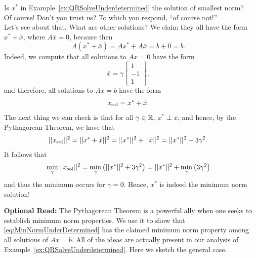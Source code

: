 \vspace*{.2cm}

\begin{tcolorbox}[title = \textbf{A Quick Check}]
Is $x^\ast$ in Example~\ref{ex:QRSolveUnderdetermined} the solution of smallest norm? Of course! Don't you trust us? To which you respond, ``of course not!'' \\

Let's see about that. What are other solutions? We claim they all have the form
$x^\ast + \bar{x}$, where $A \bar{x} = 0$, because then 
$$A(x^\ast + \bar{x}) = A x^\ast + A \bar{x} = b + 0 = b.$$
Indeed, we compute that all solutions to $Ax = 0$ have the form
$$ \bar{x} = \gamma \left[ \begin{array}{r}
1 \\
-1 \\ 
 1  \end{array} \right],$$
 and therefore, all solutions to $Ax=b$ have the form
 $$x_{\rm sol} = x^\ast + \bar{x}. $$
 The next thing we can check is that for all $\gamma \in \mathbb R,$ $x^\ast \perp \bar{x}$, and hence, by the Pythagorean Theorem, we have that
 $$||x_{\rm sol}||^2 = ||x^\ast + \bar{x}||^2 =  ||x^\ast||^2 + ||\bar{x}||^2 = ||x^\ast||^2 + {3} \gamma^2.$$
 It follows that $$\min_{\gamma} || x_{\rm sol}||^2 = \min_{\gamma} \left( ||x^\ast||^2 + {3} \gamma^2  \right) =  ||x^\ast||^2 + \min_{\gamma} \left({3} \gamma^2\right)$$
and thus the minimum occurs for $\gamma = 0$. Hence, $x^\ast$ is indeed the minimum norm solution! 
\end{tcolorbox}

\vspace*{.2cm} 

\textbf{Optional Read:} The Pythagorean Theorem is a powerful ally when one seeks to establish minimum norm properties. We use it to show that \eqref{eq:MinNormUnderDetermined} has the claimed minimum norm property among all solutions of $Ax=b$. All of the ideas are actually present in our analysis of Example~\ref{ex:QRSolveUnderdetermined}. Here we sketch the general case.\\

